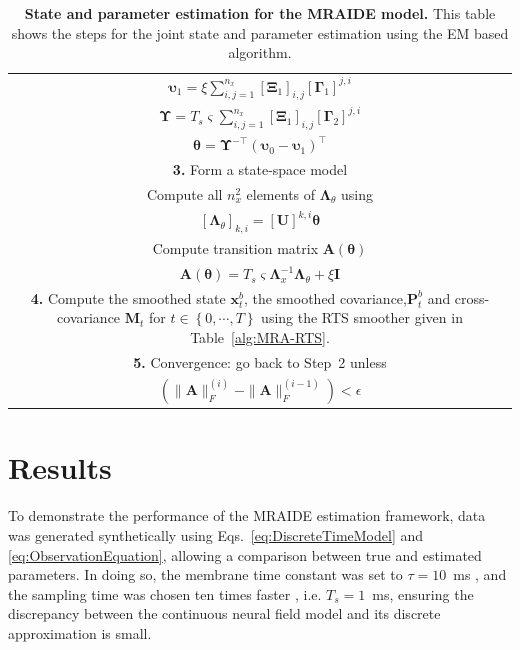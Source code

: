\documentclass[review,authoryear,3p]{elsarticle}
\begin{document}
\begin{table}[!ht]
\begin{tabular}{|c|}
$\boldsymbol\upsilon_1=\xi\sum_{i,j=1}^{n_x}[\boldsymbol\Xi_1]_{i,j}[\boldsymbol\Gamma_1]^{j,i}$\\
$\boldsymbol\Upsilon=T_s\varsigma\sum_{i,j=1}^{n_x}[\boldsymbol\Xi_1]_{i,j}[\boldsymbol\Gamma_2]^{j,i}$\\
$\boldsymbol \theta= \boldsymbol\Upsilon^{-\top}(\boldsymbol\upsilon_0-\boldsymbol\upsilon_1)^\top$\\
\hline
\multicolumn{1}{|p{16cm}|}{\textbf{3.} Form a state-space model}\\
\multicolumn{1}{|p{16cm}|}{Compute all $n_x^2$ elements of $\boldsymbol\Lambda_{\theta}$ using} \\
$\left[ \boldsymbol\Lambda_{\theta}\right] _{k,i}=\left[ \mathbf U\right]^{k,i}\boldsymbol\theta$\\
\multicolumn{1}{|p{16cm}|}{Compute transition matrix $\mathbf A(\boldsymbol\theta)$ } \\
$\mathbf A(\boldsymbol \theta) = T_s\varsigma\mathbf{\Lambda}_{x}^{-1}\mathbf{\Lambda}_{\theta}+\xi\mathbf I$\\
\hline
\multicolumn{1}{|p{16cm}|}{\textbf{4.} Compute the smoothed state $\mathbf x_t^b$, the smoothed covariance,$\mathbf P^b_t$ and cross-covariance $\mathbf M_t$ for $t\in\left\lbrace 0,\cdots,T\right\rbrace $ using the RTS smoother given in Table~\ref{alg:MRA-RTS}.}\\  
\hline
\multicolumn{1}{|p{16cm}|}{\textbf{5.} Convergence: go back to Step~2 unless }\\
$ \left(\parallel \mathbf{A} \parallel_{F}^{(i)}-\parallel \mathbf{A} \parallel_{F}^{(i-1)}\right)<\epsilon$\\
\hline
\end{tabular}
\caption{\textbf{State and parameter estimation for the MRAIDE model.} This table shows the steps for the joint state and parameter estimation using the EM based algorithm.}
\label{alg:EMsteps}
\end{table}
\renewcommand{\arraystretch}{1}
\section{Results}\label{sec:MRA-results}
To demonstrate the performance of the MRAIDE estimation framework, data was generated synthetically  using Eqs.~\eqref{eq:DiscreteTimeModel} and \eqref{eq:ObservationEquation}, allowing a comparison between true and estimated parameters. In doing so, the membrane time constant was set to $\tau = 10$~ms \citep{David2003}, and the sampling time was chosen ten times faster \citep{Stephan2008}, i.e. $T_s = 1$~ms, ensuring the discrepancy between the continuous neural field model and its discrete approximation is small. 
\end{document}
